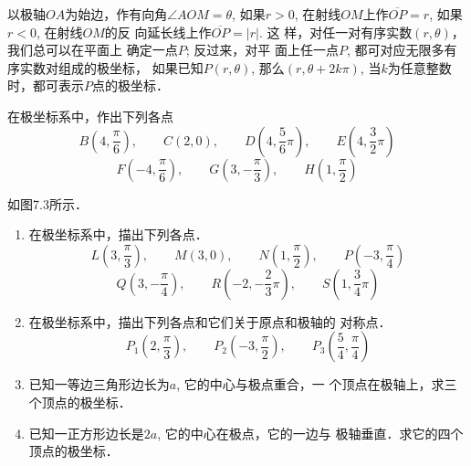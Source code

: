 以极轴$OA$为始边，作有向角$\angle AOM=\theta$, 如果$r>0$, 
在射线$OM$上作$\overline{OP}=r$, 
如果$r<0$, 在射线$OM$的反
向延长线上作$\overline{OP}=|r|$. 这
样，对任一对有序实数$(r,\theta)$，我们总可以在平面上
确定一点$P$; 反过来，对平
面上任一点$P$, 都可对应无限多有序实数对组成的极坐标，
如果已知$P(r,\theta)$, 那么$(r,\theta+2k\pi)$, 当$k$为任意整数
时，都可表示$P$点的极坐标．

\begin{example}
    在极坐标系中，作出下列各点
\[B\left(4,\frac{\pi}{6}\right),\qquad C(2,0),\qquad D\left(4,\frac{5}{6}\pi\right),\qquad E\left(4,\frac{3}{2}\pi\right)\]
\[F\left(-4,\frac{\pi}{6}\right),\qquad G\left(3,-\frac{\pi}{3}\right),\qquad H\left(1,\frac{\pi}{2}\right)\]
\end{example}

\begin{solution}
    如图7.3所示．
\begin{figure}[htp]
    \centering
{}   
    \caption{}
\end{figure}
\end{solution}

\begin{ex}
\begin{enumerate}
    \item 在极坐标系中，描出下列各点．
  \[  L\left(3,\frac{\pi}{3}\right),\qquad  M(3,0),\qquad N\left(1,\frac{\pi}{2}\right),\qquad P\left(-3,\frac{\pi}{4}\right)\]
\[    Q\left(3, -\frac{\pi}{4}\right), \qquad R\left(-2,-\frac{2}{3}\pi\right),\qquad S\left(1,\frac{3}{4}\pi \right)\]
\item 在极坐标系中，描出下列各点和它们关于原点和极轴的
    对称点．
\[P_1\left(2,\frac{\pi}{3}\right),\qquad P_2\left(-3,\frac{\pi}{2}\right),\qquad P_3\left(\frac{5}{4},\frac{\pi}{4}\right)\]
    \item 已知一等边三角形边长为$a$, 它的中心与极点重合，一
    个顶点在极轴上，求三个顶点的极坐标．
    \item 已知一正方形边长是$2a$, 它的中心在极点，它的一边与
    极轴垂直．求它的四个顶点的极坐标．
\end{enumerate}
\end{ex}

